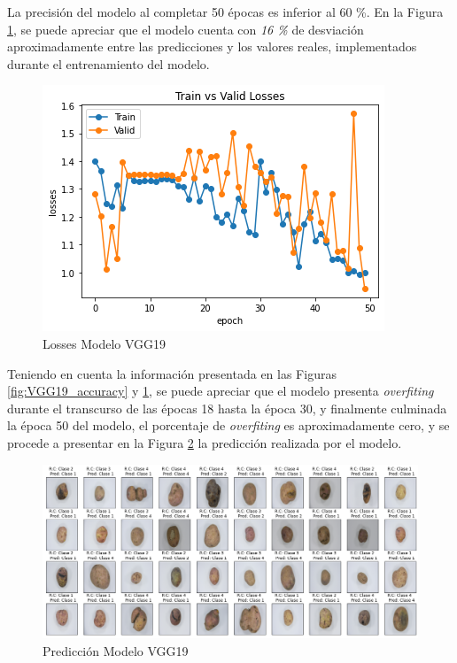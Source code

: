 La precisión del modelo al completar 50 épocas es inferior al 60 \%.	En la Figura \ref{fig:VGG19_losses}, se puede apreciar que el modelo cuenta con \textit{16 \%} de desviación aproximadamente entre las predicciones y los valores reales, implementados durante el entrenamiento del modelo.

\begin{figure}[ht]
	\centering
	\includegraphics[scale=0.55]{Figs/102.png}
	\caption{Losses Modelo VGG19}
	\label{fig:VGG19_losses}
\end{figure}

Teniendo en cuenta la información presentada en las Figuras \ref{fig:VGG19_accuracy} y \ref{fig:VGG19_losses}, se puede apreciar que el modelo presenta \textit{overfiting} durante el transcurso de las épocas 18 hasta la época 30, y finalmente culminada la época 50 del modelo, el porcentaje de \textit{overfiting} es aproximadamente cero, y se procede a presentar en la Figura \ref*{fig:VGG19_prediccion} la predicción realizada por el modelo.

\begin{figure}[ht]
	\centering
	\includegraphics[scale=0.4]{Figs/103.png}
	\caption{Predicción Modelo VGG19}
	\label{fig:VGG19_prediccion}
\end{figure}

